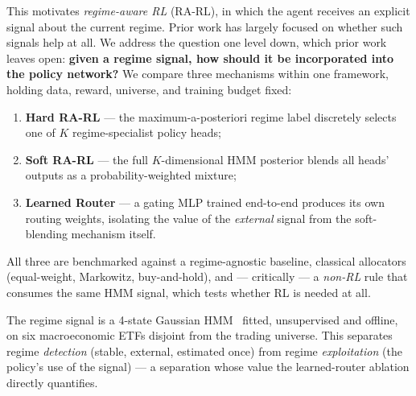 \documentclass[sigconf,anonymous,review]{acmart}
\begin{document}
This motivates \emph{regime-aware RL} (RA-RL), in which the agent receives
an explicit signal about the current regime. Prior work has largely focused
on whether such signals help at all. We address the question one level
down, which prior work leaves open: \textbf{given a regime signal, how
should it be incorporated into the policy network?} We compare three
mechanisms within one framework, holding data, reward, universe, and
training budget fixed:
\begin{enumerate}
  \item \textbf{Hard RA-RL} --- the maximum-a-posteriori regime label
        discretely selects one of $K$ regime-specialist policy heads;
  \item \textbf{Soft RA-RL} --- the full $K$-dimensional HMM posterior
        blends all heads' outputs as a probability-weighted mixture;
  \item \textbf{Learned Router} --- a gating MLP trained end-to-end
        produces its own routing weights, isolating the value of the
        \emph{external} signal from the soft-blending mechanism itself.
\end{enumerate}
All three are benchmarked against a regime-agnostic baseline, classical
allocators (equal-weight, Markowitz, buy-and-hold), and --- critically ---
a \emph{non-RL} rule that consumes the same HMM signal, which tests whether
RL is needed at all.

The regime signal is a 4-state Gaussian HMM~\cite{hamilton1989} fitted,
unsupervised and offline, on six macroeconomic ETFs disjoint from the
trading universe. This separates regime \emph{detection} (stable, external,
estimated once) from regime \emph{exploitation} (the policy's use of the
signal) --- a separation whose value the learned-router ablation directly
quantifies.
\end{document}
